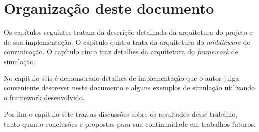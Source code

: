 \section{Organização deste documento}

Os capítulos seguintes tratam da descrição detalhada da arquitetura do projeto e de sua implementação. O capítulo quatro trata da arquitetura do \textit{middleware} de comunicação. O capítulo cinco traz detalhes da arquitetura do \textit{framework} de simulação.

No capítulo seis é demonstrado detalhes de implementação que o autor julga conveniente descrever neste documento e alguns exemplos de simulação utilizando o framework desenvolvido.

Por fim o capítulo sete traz as discussões sobre os resultados desse trabalho, tanto quanto conclusões e propostas para sua continuaidade em trabalhos futuros.
